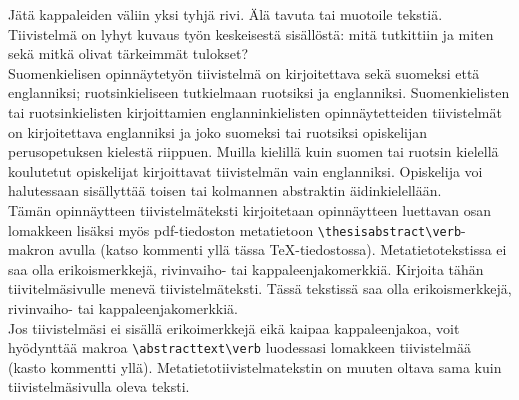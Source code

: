 \documentclass[english, 12pt, a4paper, sci, utf8, a-2b, online]{aaltothesis}
\begin{document}

\newpage
\date{19.2.2026}
\begin{abstractpage}[finnish]
  Jätä kappaleiden väliin yksi tyhjä rivi. Älä tavuta tai muotoile tekstiä.\\

  \noindent
  Tiivistelmä on lyhyt kuvaus työn keskeisestä sisällöstä:
  mitä tutkittiin ja miten sekä mitkä olivat tärkeimmät tulokset?\\

  \noindent
  Suomenkielisen opinnäytetyön tiivistelmä on kirjoitettava sekä suomeksi että 
  englanniksi; ruotsinkieliseen tutkielmaan ruotsiksi ja englanniksi. 
  Suomenkielisten tai ruotsinkielisten kirjoittamien englanninkielisten
  opinnäytetteiden tiivistelmät on kirjoitettava englanniksi ja joko suomeksi 
  tai ruotsiksi opiskelijan perusopetuksen kielestä riippuen. Muilla kielillä 
  kuin suomen tai ruotsin kielellä koulutetut opiskelijat kirjoittavat 
  tiivistelmän vain englanniksi. Opiskelija voi halutessaan sisällyttää toisen 
  tai kolmannen abstraktin äidinkielellään.\\

  \noindent
  Tämän opinnäytteen tiivistelmäteksti kirjoitetaan opinnäytteen luettavan osan
  lomakkeen lisäksi myös pdf-tiedoston metatietoon
  \verb+\thesisabstract\verb+-makron avulla (katso kommenti yllä tässa 
  \TeX{}-tiedostossa). Metatietotekstissa ei saa olla erikoismerkkejä, 
  rivinvaiho- tai kappaleenjakomerkkiä. Kirjoita tähän tiivitelmäsivulle menevä 
  tiivistelmäteksti. Tässä tekstissä saa olla erikoismerkkejä, rivinvaiho- tai 
  kappaleenjakomerkkiä.\\

  \noindent
  Jos tiivistelmäsi ei sisällä erikoimerkkejä eikä kaipaa kappaleenjakoa, voit 
  hyödynttää makroa \verb+\abstracttext\verb+ luodessasi lomakkeen tiivistelmää 
  (kasto kommentti yllä). Metatietotiivistelmatekstin on muuten oltava sama kuin 
  tiivistelmäsivulla oleva teksti.
\end{abstractpage}
\end{document}
